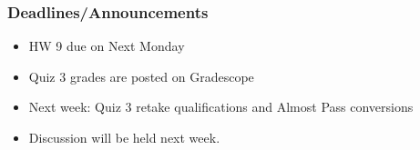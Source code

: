 \begin{frame}
    \frametitle{Deadlines/Announcements}
    \begin{itemize}
      \item HW 9 due on Next Monday
       \item Quiz 3 grades are posted on Gradescope
       \item Next week: Quiz 3 retake qualifications and Almost Pass conversions
       \item Discussion will be held next week.
    \end{itemize}
\end{frame}